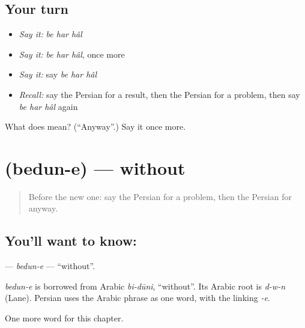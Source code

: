 \subsection*{Your turn}
\begin{itemize}
\raggedright
  \item \emph{Say it:} \emph{be har hâl}
  \item \emph{Say it:} \emph{be har hâl}, once more
  \item \emph{Say it:} say \emph{be har hâl}
  \item \emph{Recall:} say the Persian for a result, then the Persian for a problem, then say \emph{be har hâl} again
\end{itemize}

\begin{tcolorbox}[breakable,colback=teal!4,colframe=teal!35!black,title={Before you move on}]
What does    mean? (\textquotedblleft{}Anyway\textquotedblright{}.) Say it once more.
\end{tcolorbox}
\section[\texorpdfstring{\fa{بدون} (bedun-e)}{بدون (bedun-e)}]{ (bedun-e) — without}

\label{lesson:FA-C159-bedun-e}



\begin{quote}
Before the new one: say the Persian for a problem, then the Persian for anyway.
\end{quote}

\subsection*{You'll want to know: }
\textbf{} — \emph{bedun-e} — \textquotedblleft{}without\textquotedblright{}.

\begin{cousinweb}
\emph{bedun-e} is borrowed from Arabic \emph{bi-dūni}, \textquotedblleft{}without\textquotedblright{}. Its Arabic root is \emph{d-w-n} (Lane). Persian uses the Arabic phrase as one word, with the linking \emph{-e}.
\end{cousinweb}

\begin{grammarlens}[title={What you've built}]
One more word for this chapter.
\end{grammarlens}

